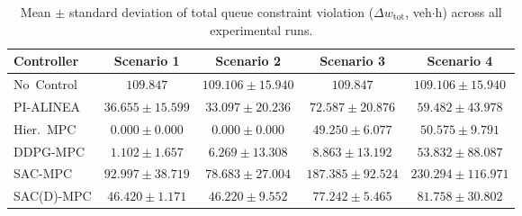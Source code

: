 \begin{table}[htbp]
\centering
\caption{Mean $\pm$ standard deviation of total queue constraint violation ($\Delta w_{\mathrm{tot}}$, veh$\cdot$h) across all experimental runs.}
\label{tab:dw_tot_comparison}
\begin{tabular}{lcccc}
\toprule
Controller & Scenario 1 & Scenario 2 & Scenario 3 & Scenario 4 \\
\midrule
No~Control & $109.847$ & $109.106 \pm 15.940$ & $109.847$ & $109.106 \pm 15.940$ \\
PI-ALINEA & $36.655 \pm 15.599$ & $33.097 \pm 20.236$ & $72.587 \pm 20.876$ & $59.482 \pm 43.978$ \\
Hier.~MPC & $0.000 \pm 0.000$ & $0.000 \pm 0.000$ & $49.250 \pm 6.077$ & $50.575 \pm 9.791$ \\
DDPG-MPC & $1.102 \pm 1.657$ & $6.269 \pm 13.308$ & $8.863 \pm 13.192$ & $53.832 \pm 88.087$ \\
SAC-MPC & $92.997 \pm 38.719$ & $78.683 \pm 27.004$ & $187.385 \pm 92.524$ & $230.294 \pm 116.971$ \\
SAC(D)-MPC & $46.420 \pm 1.171$ & $46.220 \pm 9.552$ & $77.242 \pm 5.465$ & $81.758 \pm 30.802$ \\
\bottomrule
\end{tabular}
\end{table}
